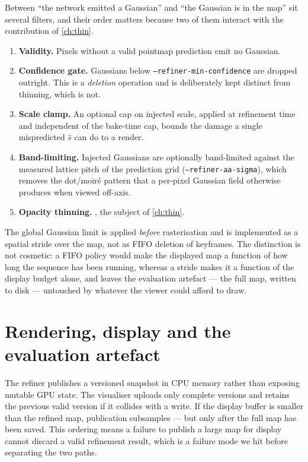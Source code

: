 Between ``the network emitted a Gaussian'' and ``the Gaussian is in the map''
sit several filters, and their order matters because two of them interact with
the contribution of \cref{ch:thin}.

\begin{enumerate}\itemsep3pt
\item \textbf{Validity.} Pixels without a valid pointmap prediction emit no
      Gaussian.
\item \textbf{Confidence gate.} Gaussians below \texttt{--refiner-min-confidence}
      are dropped outright. This is a \emph{deletion} operation and is
      deliberately kept distinct from thinning, which is not.
\item \textbf{Scale clamp.} An optional cap on injected scale, applied at
      refinement time and independent of the bake-time cap, bounds the damage a
      single mispredicted $\hat{s}$ can do to a render.
\item \textbf{Band-limiting.} Injected Gaussians are optionally band-limited
      against the measured lattice pitch of the prediction grid
      (\texttt{--refiner-aa-sigma}), which removes the dot/moir\'e pattern that
      a per-pixel Gaussian field otherwise produces when viewed off-axis.
\item \textbf{Opacity thinning.} , the subject of
      \cref{ch:thin}.
\end{enumerate}

The global Gaussian limit is applied \emph{before} rasterisation and is
implemented as a spatial stride over the map, not as FIFO deletion of
keyframes. The distinction is not cosmetic: a FIFO policy would make the
displayed map a function of how long the sequence has been running, whereas a
stride makes it a function of the display budget alone, and leaves the
evaluation artefact --- the full map, written to disk --- untouched by whatever
the viewer could afford to draw.

\section{Rendering, display and the evaluation artefact}
\label{sec:system:render}

The refiner publishes a versioned snapshot in CPU memory rather than exposing
mutable GPU state. The visualiser uploads only complete versions and retains
the previous valid version if it collides with a write. If the display buffer
is smaller than the refined map, publication subsamples --- but only after the
full map has been saved. This ordering means a failure to publish a large map
for display cannot discard a valid refinement result, which is a failure mode
we hit before separating the two paths.


